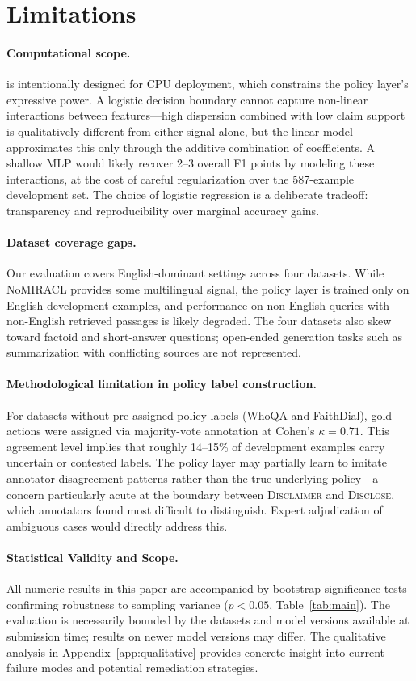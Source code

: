 \section{Limitations}
\label{sec:limitations}

\paragraph{Computational scope.}
\method{} is intentionally designed for CPU deployment, which constrains the policy layer's expressive power. A logistic decision boundary cannot capture non-linear interactions between features---high dispersion combined with low claim support is qualitatively different from either signal alone, but the linear model approximates this only through the additive combination of coefficients. A shallow MLP would likely recover 2--3 overall F1 points by modeling these interactions, at the cost of careful regularization over the 587-example development set. The choice of logistic regression is a deliberate tradeoff: transparency and reproducibility over marginal accuracy gains.

\paragraph{Dataset coverage gaps.}
Our evaluation covers English-dominant settings across four datasets. While NoMIRACL provides some multilingual signal, the policy layer is trained only on English development examples, and performance on non-English queries with non-English retrieved passages is likely degraded. The four datasets also skew toward factoid and short-answer questions; open-ended generation tasks such as summarization with conflicting sources are not represented.

\paragraph{Methodological limitation in policy label construction.}
For datasets without pre-assigned policy labels (WhoQA and FaithDial), gold actions were assigned via majority-vote annotation at Cohen's $\kappa = 0.71$. This agreement level implies that roughly 14--15\% of development examples carry uncertain or contested labels. The policy layer may partially learn to imitate annotator disagreement patterns rather than the true underlying policy---a concern particularly acute at the boundary between \textsc{Disclaimer} and \textsc{Disclose}, which annotators found most difficult to distinguish. Expert adjudication of ambiguous cases would directly address this.

\paragraph{Statistical Validity and Scope.}
All numeric results in this paper are accompanied by bootstrap significance tests confirming robustness to sampling variance ($p{<}0.05$, Table~\ref{tab:main}). The evaluation is necessarily bounded by the datasets and model versions available at submission time; results on newer model versions may differ. The qualitative analysis in Appendix~\ref{app:qualitative} provides concrete insight into current failure modes and potential remediation strategies.
